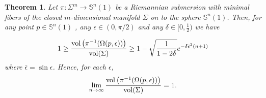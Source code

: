 \documentclass{amsart}
\newtheorem{theorem}{Theorem}[section]
\theoremstyle{definition}
\theoremstyle{remark}
\begin{document}
\begin{theorem}\label{TeoSub}
Let  $\pi: \Sigma^m \to \mathbb{S}^n(1)$ be a Riemannian submersion with minimal fibers  of the closed $m$-dimensional manifold $\Sigma$ on to the sphere  $\mathbb{S}^n(1)$. Then, for any point $p \in \mathbb{S}^n(1)$ , any  $\epsilon \in (0,\pi/2)$ and any $\delta\in [0,\frac{1}{2})$ we have 

\begin{equation}
1\geq \frac{{\rm vol}\left(\pi^{-1}(\Omega(p,\epsilon))\right)}{{\rm vol}(\Sigma)}\geq  1- \sqrt{\frac{1}{1-2\delta}}e^{-\delta\bar\epsilon^2(n+1)}
\end{equation}
where $\bar\epsilon=\sin\epsilon$. Hence, for each  $\epsilon$,
\begin{equation}
\lim_{n\to\infty}\frac{{\rm vol}\left(\pi^{-1}(\Omega(p,\epsilon))\right)}{{\rm vol}(\Sigma)}=1.
\end{equation}
\end{theorem}
\end{document}

